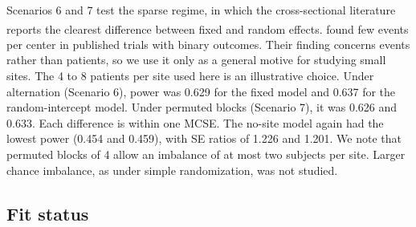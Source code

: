 \documentclass[
  11pt,
]{article}
\begin{document}
Scenarios 6 and 7 test the sparse regime, in which the
cross-sectional literature reports the clearest difference between
fixed and random effects.\textsuperscript{} found few events per
center in published trials with binary outcomes. Their finding
concerns events rather than patients, so we use it only as a
general motive for studying small sites. The 4 to 8 patients per
site used here is an illustrative choice. Under alternation
(Scenario 6), power was 0.629
for the fixed model and 0.637
for the random-intercept model. Under permuted blocks (Scenario 7),
it was 0.626 and
0.633. Each difference is
within one MCSE. The no-site model again had the lowest power
(0.454 and
0.459), with SE ratios of
1.226 and
1.201. We note that
permuted blocks of 4 allow an imbalance of at most two subjects per
site. Larger chance imbalance, as under simple randomization, was
not studied.

\subsection{Fit status}\label{fit-status}

\begingroup\fontsize{8}{10}\selectfont
\end{document}
